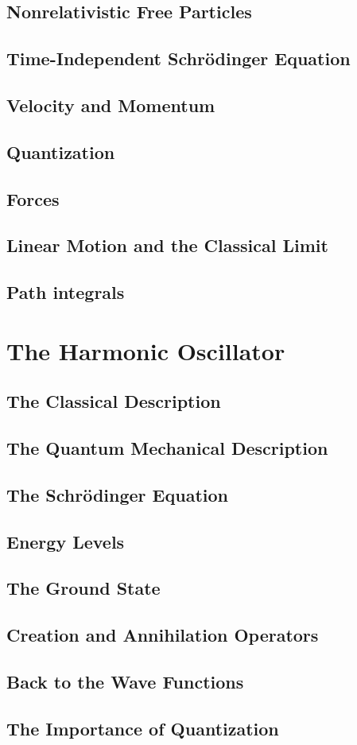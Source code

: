 \documentclass[a4paper]{article}
\begin{document}
\subsection{Nonrelativistic Free Particles}
\subsection{Time-Independent Schr\"odinger Equation}

\subsection{Velocity and Momentum}

\subsection{Quantization}
\subsection{Forces}

\subsection{Linear Motion and the Classical Limit}
\subsection{Path integrals}
\section{The Harmonic Oscillator}
\subsection{The Classical Description}

\subsection{The Quantum Mechanical Description}
\subsection{The Schr\"odinger Equation}
\subsection{Energy Levels}
\subsection{The Ground State}
\subsection{Creation and Annihilation Operators}
\subsection{Back to the Wave Functions}
\subsection{The Importance of Quantization}
\end{document}
